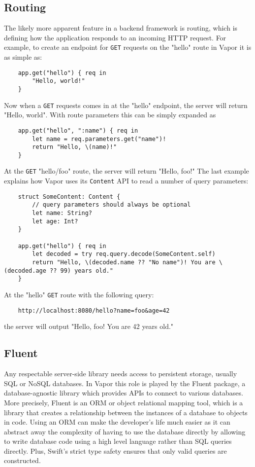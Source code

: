 \subsection{Routing}
The likely more apparent feature in a backend framework is routing, which is defining how the application responds to an incoming HTTP request. For example, to create an endpoint for \lstinline{GET} requests on the "hello" route in Vapor it is as simple as:
\begin{verbatim}
    app.get("hello") { req in 
        "Hello, world!" 
    }
\end{verbatim}
Now when a \lstinline{GET}  requests comes in at the "hello" endpoint, the server will return "Hello, world".
With route parameters this can be simply expanded as
\begin{verbatim}
    app.get("hello", ":name") { req in 
        let name = req.parameters.get("name")!
        return "Hello, \(name)!"
    }
\end{verbatim}
At the \lstinline{GET} "hello/foo" route, the server will return "Hello, foo!"
The last example explains how Vapor uses its \lstinline{Content} API to read a number of query parameters:
\begin{verbatim}
    struct SomeContent: Content {
        // query parameters should always be optional
        let name: String?
        let age: Int?
    }

    app.get("hello") { req in 
        let decoded = try req.query.decode(SomeContent.self)
        return "Hello, \(decoded.name ?? "No name")! You are \(decoded.age ?? 99) years old."
    }
\end{verbatim}
At the "hello" \lstinline{GET} route with the following query:
\begin{verbatim}
    http://localhost:8080/hello?name=foo&age=42
\end{verbatim}
the server will output "Hello, foo! You are 42 years old." \cite{vapor-docs}

\subsection{Fluent}
Any respectable server-side library needs access to persistent storage, usually SQL or NoSQL databases. In Vapor this role is played by the Fluent package, a database-agnostic library which provides APIs to connect to various databases. More precisely, Fluent is an ORM or object relational mapping tool, which is a library that creates a relationship between the instances of a database to objects in code. 
Using an ORM can make the developer's life much easier as it can abstract away the complexity of having to use the database directly by allowing to write database code using a high level language rather than SQL queries directly. Plus, Swift's strict type safety ensures that only valid queries are constructed. 
